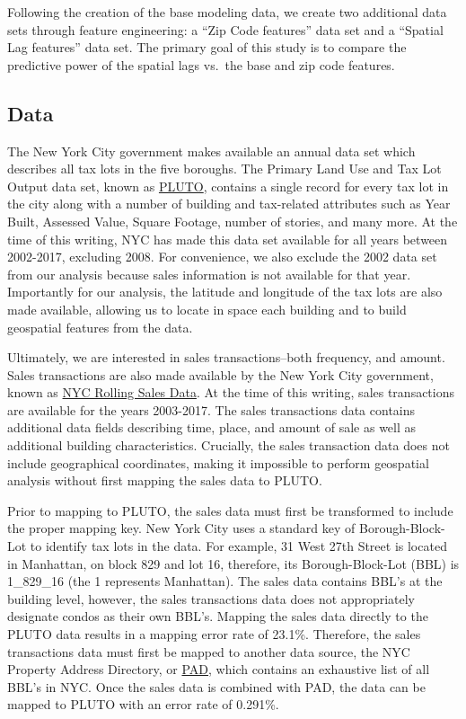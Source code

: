 \documentclass[12pt,]{article}
\begin{document}
Following the creation of the base modeling data, we create two
additional data sets through feature engineering: a ``Zip Code
features'' data set and a ``Spatial Lag features'' data set. The primary
goal of this study is to compare the predictive power of the spatial
lags vs.~the base and zip code features.

\subsection{Data}\label{data}

The New York City government makes available an annual data set which
describes all tax lots in the five boroughs. The Primary Land Use and
Tax Lot Output data set, known as
\href{https://www1.nyc.gov/site/planning/data-maps/open-data/bytes-archive.page?sorts\%5Byear\%5D=0}{PLUTO},
contains a single record for every tax lot in the city along with a
number of building and tax-related attributes such as Year Built,
Assessed Value, Square Footage, number of stories, and many more. At the
time of this writing, NYC has made this data set available for all years
between 2002-2017, excluding 2008. For convenience, we also exclude the
2002 data set from our analysis because sales information is not
available for that year. Importantly for our analysis, the latitude and
longitude of the tax lots are also made available, allowing us to locate
in space each building and to build geospatial features from the data.

Ultimately, we are interested in sales transactions--both frequency, and
amount. Sales transactions are also made available by the New York City
government, known as
\href{http://www1.nyc.gov/site/finance/taxes/property-annualized-sales-update.page}{NYC
Rolling Sales Data}. At the time of this writing, sales transactions are
available for the years 2003-2017. The sales transactions data contains
additional data fields describing time, place, and amount of sale as
well as additional building characteristics. Crucially, the sales
transaction data does not include geographical coordinates, making it
impossible to perform geospatial analysis without first mapping the
sales data to PLUTO.

Prior to mapping to PLUTO, the sales data must first be transformed to
include the proper mapping key. New York City uses a standard key of
Borough-Block-Lot to identify tax lots in the data. For example, 31 West
27th Street is located in Manhattan, on block 829 and lot 16, therefore,
its Borough-Block-Lot (BBL) is 1\_829\_16 (the 1 represents Manhattan).
The sales data contains BBL's at the building level, however, the sales
transactions data does not appropriately designate condos as their own
BBL's. Mapping the sales data directly to the PLUTO data results in a
mapping error rate of 23.1\%. Therefore, the sales transactions data
must first be mapped to another data source, the NYC Property Address
Directory, or
\href{https://data.cityofnewyork.us/City-Government/Property-Address-Directory/bc8t-ecyu/data}{PAD},
which contains an exhaustive list of all BBL's in NYC. Once the sales
data is combined with PAD, the data can be mapped to PLUTO with an error
rate of 0.291\%.
\end{document}
